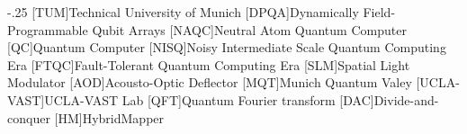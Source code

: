 \documentclass[headsepline,footsepline,footinclude=false,oneside,fontsize=11pt,paper=a4,listof=totoc,bibliography=totoc]{scrbook} %
\begin{document}


\frontmatter{}





\tableofcontents{}

\mainmatter{}










\appendix{}


\begin{acronym}
	\itemsep-.25\baselineskip
	[TUM]{Technical University of Munich}
	[DPQA]{Dynamically Field-Programmable Qubit Arrays}
	[NAQC]{Neutral Atom Quantum Computer}
	[QC]{Quantum Computer}
	[NISQ]{Noisy Intermediate Scale Quantum Computing Era}
	[FTQC]{Fault-Tolerant Quantum Computing Era}
	[SLM]{Spatial Light Modulator}
	[AOD]{Acousto-Optic Deflector}
	[MQT]{Munich Quantum Valey}
	[UCLA-VAST]{UCLA-VAST Lab}
	[QFT]{Quantum Fourier transform}
	[DAC]{Divide-and-conquer}
	[HM]{HybridMapper}
\end{acronym}

\listoffigures{}
\listoftables{}
\printbibliography{}
\end{document}

